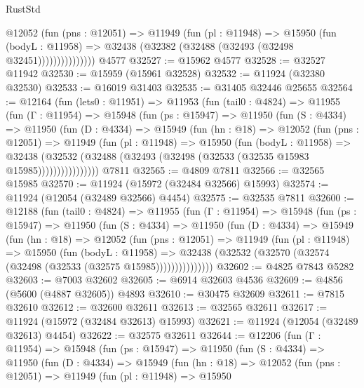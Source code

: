 \begin{lexlean}{RustStd}
\begin{coremodule}
{\begin{coremodule}
{{{{{{{{{{{{{{{{{{{{{{{{{{{{{{{{{{{{{{{{{{{{{{{{{{{{{{{{{{{{{{{{{{{{{{{{{{{{{{{{                  @12052
                    (fun (pns : @12051) =>
                    @11949
                      (fun (pl : @11948) =>
                      @15950
                        (fun (bodyL : @11958) =>
                        @32438 (@32382 (@32488 (@32493 (@32498 @32451)))))))))))))))
    @4577
@32527 := @15962 @4577
@32528 := @32527 @11942
@32530 := @15959 (@15961 @32528)
@32532 := @11924 (@32380 @32530)
@32533 := @16019 @31403
@32535 := @31405 @32446 @25655
@32564 := @12164
    (fun (lets0 : @11951) =>
    @11953
      (fun (tail0 : @4824) =>
      @11955
        (fun (Γ : @11954) =>
        @15948
          (fun (ps : @15947) =>
          @11950
            (fun (S : @4334) =>
            @11950
              (fun (D : @4334) =>
              @15949
                (fun (hn : @18) =>
                @12052
                  (fun (pns : @12051) =>
                  @11949
                    (fun (pl : @11948) =>
                    @15950
                      (fun (bodyL : @11958) =>
                      @32438
                        (@32532
                          (@32488 (@32493 (@32498 (@32533 (@32535 @15983 @15985))))))))))))))))
    @7811
@32565 := @4809 @7811
@32566 := @32565 @15985
@32570 := @11924 (@15972 (@32484 @32566) @15993)
@32574 := @11924 (@12054 (@32489 @32566) @4454)
@32575 := @32535 @7811
@32600 := @12188
    (fun (tail0 : @4824) =>
    @11955
      (fun (Γ : @11954) =>
      @15948
        (fun (ps : @15947) =>
        @11950
          (fun (S : @4334) =>
          @11950
            (fun (D : @4334) =>
            @15949
              (fun (hn : @18) =>
              @12052
                (fun (pns : @12051) =>
                @11949
                  (fun (pl : @11948) =>
                  @15950
                    (fun (bodyL : @11958) =>
                    @32438 (@32532 (@32570 (@32574 (@32498 (@32533 (@32575 @15985)))))))))))))))
@32602 := @4825 @7843 @5282
@32603 := @7003 @32602
@32605 := @6914 @32603 @4536
@32609 := @4856 (@5600 (@4887 @32605)) @4893
@32610 := @30475 @32609
@32611 := @7815 @32610
@32612 := @32600 @32611
@32613 := @32565 @32611
@32617 := @11924 (@15972 (@32484 @32613) @15993)
@32621 := @11924 (@12054 (@32489 @32613) @4454)
@32622 := @32575 @32611
@32644 := @12206
    (fun (Γ : @11954) =>
    @15948
      (fun (ps : @15947) =>
      @11950
        (fun (S : @4334) =>
        @11950
          (fun (D : @4334) =>
          @15949
            (fun (hn : @18) =>
            @12052
              (fun (pns : @12051) =>
              @11949
                (fun (pl : @11948) =>
                @15950
}}}}}}}}}}}}}}}}}}}}}}}}}}}}}}}}}}}}}}}}}}}}}}}}}}}}}}}}}}}}}}}}}}}}}}}}}}}}}}}}
\end{coremodule}}
\end{coremodule}
\end{lexlean}
